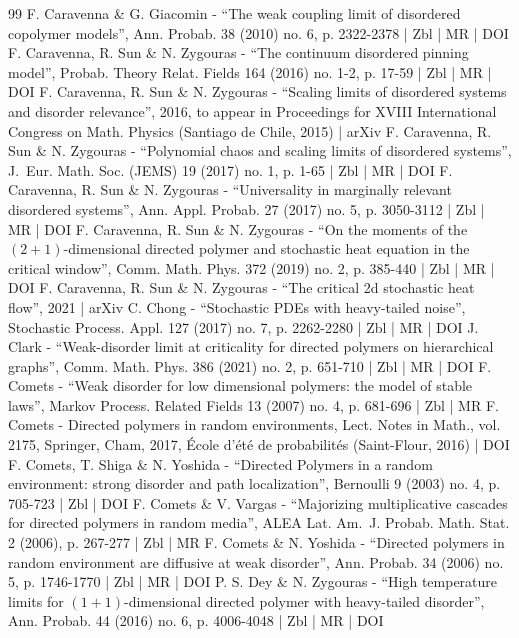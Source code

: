 \begin{thebibliography}{99}
F. Caravenna \& G. Giacomin - “The weak coupling limit of disordered copolymer models”, Ann. Probab. 38 (2010) no. 6, p. 2322-2378 | Zbl | MR | DOI
F. Caravenna, R. Sun \& N. Zygouras - “The continuum disordered pinning model”, Probab. Theory Relat. Fields 164 (2016) no. 1-2, p. 17-59 | Zbl | MR | DOI
F. Caravenna, R. Sun \& N. Zygouras - “Scaling limits of disordered systems and disorder relevance”, 2016, to appear in Proceedings for XVIII International Congress on Math. Physics (Santiago de Chile, 2015) | arXiv
F. Caravenna, R. Sun \& N. Zygouras - “Polynomial chaos and scaling limits of disordered systems”, J. Eur. Math. Soc. (JEMS) 19 (2017) no. 1, p. 1-65 | Zbl | MR | DOI
F. Caravenna, R. Sun \& N. Zygouras - “Universality in marginally relevant disordered systems”, Ann. Appl. Probab. 27 (2017) no. 5, p. 3050-3112 | Zbl | MR | DOI
F. Caravenna, R. Sun \& N. Zygouras - “On the moments of the $(2+1)$-dimensional directed polymer and stochastic heat equation in the critical window”, Comm. Math. Phys. 372 (2019) no. 2, p. 385-440 | Zbl | MR | DOI
F. Caravenna, R. Sun \& N. Zygouras - “The critical 2d stochastic heat flow”, 2021 | arXiv
C. Chong - “Stochastic PDEs with heavy-tailed noise”, Stochastic Process. Appl. 127 (2017) no. 7, p. 2262-2280 | Zbl | MR | DOI
J. Clark - “Weak-disorder limit at criticality for directed polymers on hierarchical graphs”, Comm. Math. Phys. 386 (2021) no. 2, p. 651-710 | Zbl | MR | DOI
F. Comets - “Weak disorder for low dimensional polymers: the model of stable laws”, Markov Process. Related Fields 13 (2007) no. 4, p. 681-696 | Zbl | MR
F. Comets - Directed polymers in random environments, Lect. Notes in Math., vol. 2175, Springer, Cham, 2017, École d’été de probabilités (Saint-Flour, 2016) | DOI
F. Comets, T. Shiga \& N. Yoshida - “Directed Polymers in a random environment: strong disorder and path localization”, Bernoulli 9 (2003) no. 4, p. 705-723 | Zbl | DOI
F. Comets \& V. Vargas - “Majorizing multiplicative cascades for directed polymers in random media”, ALEA Lat. Am. J. Probab. Math. Stat. 2 (2006), p. 267-277 | Zbl | MR
F. Comets \& N. Yoshida - “Directed polymers in random environment are diffusive at weak disorder”, Ann. Probab. 34 (2006) no. 5, p. 1746-1770 | Zbl | MR | DOI
P. S. Dey \& N. Zygouras - “High temperature limits for $(1+ 1)$-dimensional directed polymer with heavy-tailed disorder”, Ann. Probab. 44 (2016) no. 6, p. 4006-4048 | Zbl | MR | DOI

\end{thebibliography}
